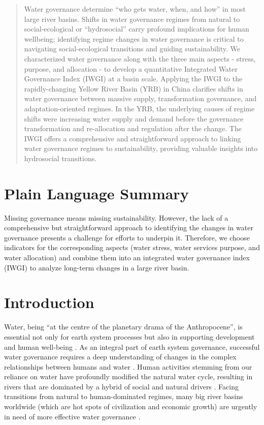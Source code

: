 \documentclass[draft]{agujournal2019}
\begin{document}
\begin{abstract}
Water governance determine ``who gets water, when, and how'' in most large river basins.
Shifts in water governance regimes from natural to social-ecological or ``hydrosocial'' carry profound implications for human wellbeing; identifying regime changes in water governance is critical to navigating social-ecological transitions and guiding sustainability.
We characterized water governance along with the three main aspects - stress, purpose, and allocation - to develop a quantitative Integrated Water Governance Index (IWGI) at a basin scale.
Applying the IWGI to the rapidly-changing Yellow River Basin (YRB) in China clarifies shifts in water governance between massive supply, transformation governance, and adaptation-oriented regimes.
In the YRB, the underlying causes of regime shifts were increasing water supply and demand before the governance transformation and re-allocation and regulation after the change.
The IWGI offers a comprehensive and straightforward approach to linking water governance regimes to sustainability, providing valuable insights into hydrosocial transitions.
\end{abstract}

\section*{Plain Language Summary}
Missing governance means missing sustainability. However, the lack of a comprehensive but straightforward approach to identifying the changes in water governance presents a challenge for efforts to underpin it. Therefore, we choose indicators for the corresponding aspects (water stress, water services purpose, and water allocation) and combine them into an integrated water governance index (IWGI) to analyze long-term changes in a large river basin.


\section{Introduction}\label{sec1}
\label{Intro.}
Water, being ``at the centre of the planetary drama of the Anthropocene'', is essential not only for earth system processes but also in supporting development and human well-being
\cite{gleeson2020a,gleeson2020b}.
As an integral part of earth system governance, successful water governance requires a deep understanding of changes in the complex relationships between humans and water
\cite{ahlstrom2021,biermann2012,steffen2020}.
Human activities stemming from our reliance on water have profoundly modified the natural water cycle, resulting in rivers that are dominated by a hybrid of social and natural drivers
\cite{sivapalan2012,qin2014,abbott2019}.
Facing transitions from natural to human-dominated regimes, many big river basins worldwide (which are hot spots of civilization and economic growth) are urgently in need of more effective water governance
\cite{best2019,dibaldassarre2019}.
\end{document}
